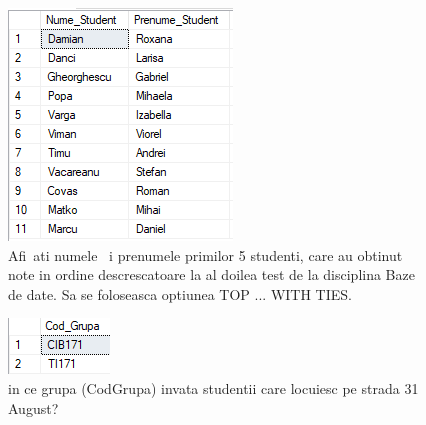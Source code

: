 \documentclass[12pt]{article}
\begin{document}
        \begin{figure}[H]
                \centering
                \includegraphics[width=.95\textwidth]{img6.png}
                \caption{Afi~ati numele ~i prenumele primilor 5 studenti, care au obtinut note in ordine descrescatoare la al doilea test de la disciplina Baze de date. Sa se foloseasca optiunea TOP ... WITH TIES.}
        \end{figure}
        \vspace{0.5 cm}

        \begin{figure}[H]
                \centering
                \includegraphics[width=.95\textwidth]{img7.png}
                \caption{in ce grupa (CodGrupa) invata studentii care locuiesc pe strada 31 August?  }
        \end{figure}
        \vspace{0.5 cm}
\end{document}
